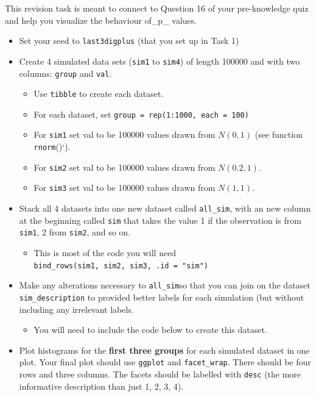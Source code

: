 \documentclass[
  openany]{book}
\providecommand{\tightlist}{%
  \setlength{\itemsep}{0pt}\setlength{\parskip}{0pt}}
\begin{document}
This revision task is meant to connect to Question 16 of your pre-knowledge quiz and help you visualize the behaviour of\_p\_ values.

\begin{itemize}
\tightlist
\item
  Set your seed to \texttt{last3digplus} (that you set up in Task 1)
\item
  Create 4 simulated data sets (\texttt{sim1} to \texttt{sim4}) of length 100000 and with two columns: \texttt{group} and \texttt{val}.

  \begin{itemize}
  \tightlist
  \item
    Use \texttt{tibble} to create each dataset.
  \item
    For each dataset, set \texttt{group\ =\ rep(1:1000,\ each\ =\ 100)}
  \item
    For \texttt{sim1} set val to be 100000 values drawn from \(N(0, 1)\) (see function \texttt{rnorm}()`).
  \item
    For \texttt{sim2} set val to be 100000 values drawn from \(N(0.2, 1)\).\\
  \item
    For \texttt{sim3} set val to be 100000 values drawn from \(N(1, 1)\).\\
  \end{itemize}
\item
  Stack all 4 datasets into one new dataset called \texttt{all\_sim}, with an new column at the beginning called \texttt{sim} that takes the value 1 if the observation is from \texttt{sim1}, 2 from \texttt{sim2}, and so on.

  \begin{itemize}
  \tightlist
  \item
    This is most of the code you will need \texttt{bind\_rows(sim1,\ sim2,\ sim3,\ .id\ =\ "sim")}
  \end{itemize}
\item
  Make any alterations necessary to \texttt{all\_sim}so that you can join on the dataset \texttt{sim\_description} to provided better labels for each simulation (but without including any irrelevant labels.

  \begin{itemize}
  \tightlist
  \item
    You will need to include the code below to create this dataset.
  \end{itemize}
\item
  Plot histograms for the \textbf{first three groups} for each simulated dataset in one plot. Your final plot should use \texttt{ggplot} and \texttt{facet\_wrap}. There should be four rows and three columns. The facets should be labelled with \texttt{desc} (the more informative description than just 1, 2, 3, 4).


\end{itemize}
\end{document}

